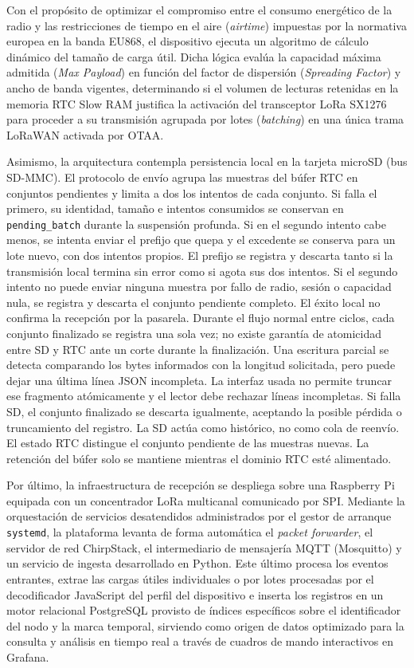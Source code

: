 Con el propósito de optimizar el compromiso entre el consumo energético de la radio 
y las restricciones de tiempo en el aire (\textit{airtime}) impuestas por la normativa 
europea en la banda EU868, el dispositivo ejecuta un algoritmo de cálculo dinámico 
del tamaño de carga útil. Dicha lógica evalúa la capacidad máxima admitida (\textit{Max Payload}) 
en función del factor de dispersión (\textit{Spreading Factor}) y ancho de banda vigentes, 
determinando si el volumen de lecturas retenidas en la memoria RTC Slow RAM justifica 
la activación del transceptor LoRa SX1276 para proceder a su transmisión agrupada 
por lotes (\textit{batching}) en una única trama LoRaWAN activada por OTAA. 

Asimismo, la arquitectura contempla persistencia local en la tarjeta microSD (bus SD-MMC).
El protocolo de envío agrupa las muestras del búfer RTC en conjuntos pendientes y limita a dos los
intentos de cada conjunto. Si falla el primero, su identidad, tamaño e intentos consumidos se conservan
en \texttt{pending\_batch} durante la suspensión profunda. Si en el segundo intento cabe menos, se
intenta enviar el prefijo que quepa y el excedente se conserva para un lote nuevo, con dos intentos
propios. El prefijo se registra y descarta tanto si la transmisión local termina sin error como si agota
sus dos intentos. Si el segundo intento no puede enviar ninguna muestra por fallo de radio, sesión o
capacidad nula, se registra y descarta el conjunto pendiente completo. El éxito local no confirma la
recepción por la pasarela. Durante el flujo normal entre ciclos, cada conjunto finalizado se registra una
sola vez; no existe garantía de atomicidad entre SD y RTC ante un corte durante la finalización. Una
escritura parcial se detecta comparando los bytes informados con la longitud solicitada, pero puede dejar
una última línea JSON incompleta. La interfaz usada no permite truncar ese fragmento atómicamente y el
lector debe rechazar líneas incompletas. Si falla SD, el conjunto finalizado se descarta igualmente,
aceptando la posible pérdida o truncamiento del registro. La SD actúa como histórico, no como cola de
reenvío. El estado RTC distingue el conjunto
pendiente de las muestras nuevas. La retención del búfer solo se mantiene mientras el dominio RTC esté
alimentado.

Por último, la infraestructura de recepción se despliega sobre una Raspberry Pi equipada con un concentrador 
LoRa multicanal comunicado por SPI. Mediante la orquestación de servicios desatendidos administrados por el gestor 
de arranque \texttt{systemd}, la plataforma levanta de forma automática el \textit{packet forwarder}, el servidor de 
red ChirpStack, el intermediario de mensajería MQTT (Mosquitto) y un servicio de ingesta desarrollado en Python. Este 
último procesa los eventos entrantes, extrae las cargas útiles individuales o por lotes procesadas por el decodificador 
JavaScript del perfil del dispositivo e inserta los registros en un motor relacional PostgreSQL provisto de índices específicos 
sobre el identificador del nodo y la marca temporal, sirviendo como origen de datos optimizado para la consulta y análisis en tiempo 
real a través de cuadros de mando interactivos en Grafana.

